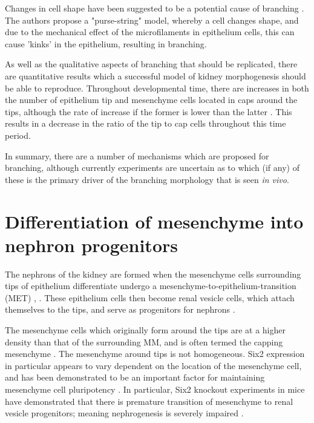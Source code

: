 \documentclass[pdftex,10pt,a4paper,twocolumn]{article}
\begin{document}
Changes in cell shape have been suggested to be a potential cause of branching \cite{Meyer2004}. The authors propose a "purse-string" model, whereby a cell changes shape, and due to the mechanical effect of the microfilaments in epithelium cells, this can cause 'kinks' in the epithelium, resulting in branching.

As well as the qualitative aspects of branching that should be replicated, there are quantitative results which a successful model of kidney morphogenesis should be able to reproduce. Throughout developmental time, there are increases in both the number of epithelium tip and mesenchyme cells located in caps around the tips, although the rate of increase if the former is lower than the latter \cite{short2014global}. This results in a decrease in the ratio of the tip to cap cells throughout this time period. 


In summary, there are a number of mechanisms which are proposed for branching, although currently experiments are uncertain as to which (if any) of these is the primary driver of the branching morphology that is seen \textit{in vivo}.

\section{Differentiation of mesenchyme into nephron progenitors}
The nephrons of the kidney are formed when the mesenchyme cells surrounding tips of epithelium differentiate undergo a mesenchyme-to-epithelium-transition (MET) \cite{CostantiniFKopan2010}, \cite{LittleMMcMahon2012}. These epithelium cells then become renal vesicle cells, which attach themselves to the tips, and serve as progenitors for nephrons \cite{short2014global}. 

The mesenchyme cells which originally form around the tips are at a higher density than that of the surrounding MM, and is often termed the capping mesenchyme \cite{LittleMMcMahon2012}. The mesenchyme around tips is not homogeneous. Six2 expression in particular appears to vary dependent on the location of the mesenchyme cell, and has been demonstrated to be an important factor for maintaining mesenchyme cell pluripotency \cite{LittleMMcMahon2012}. In particular, Six2 knockout experiments in mice have demonstrated that there is premature transition of mesenchyme to renal vesicle progenitors; meaning nephrogenesis is severely impaired \cite{self2006six2}.
\end{document}
